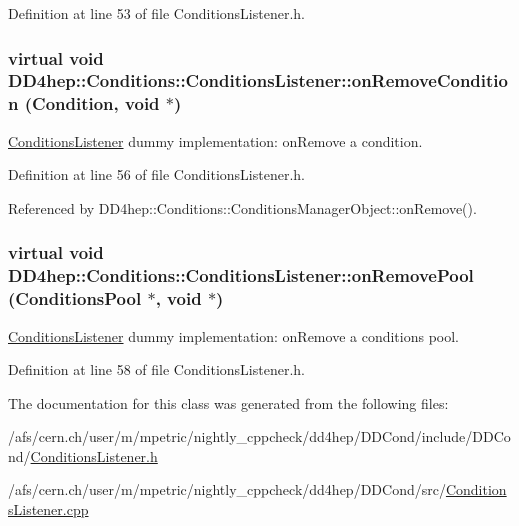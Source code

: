 Definition at line 53 of file ConditionsListener.h.\hypertarget{class_d_d4hep_1_1_conditions_1_1_conditions_listener_ab0c021c6ef8e6c47f28dd077220ee1f3}{
\subsubsection[{onRemoveCondition}]{\setlength{\rightskip}{0pt plus 5cm}virtual void DD4hep::Conditions::ConditionsListener::onRemoveCondition ({\bf Condition}, \/  void $\ast$)}}
\label{class_d_d4hep_1_1_conditions_1_1_conditions_listener_ab0c021c6ef8e6c47f28dd077220ee1f3}


\hyperlink{class_d_d4hep_1_1_conditions_1_1_conditions_listener}{ConditionsListener} dummy implementation: onRemove a condition. 

Definition at line 56 of file ConditionsListener.h.

Referenced by DD4hep::Conditions::ConditionsManagerObject::onRemove().\hypertarget{class_d_d4hep_1_1_conditions_1_1_conditions_listener_aadd6949fa8606ac66cab08494ab79412}{
\subsubsection[{onRemovePool}]{\setlength{\rightskip}{0pt plus 5cm}virtual void DD4hep::Conditions::ConditionsListener::onRemovePool ({\bf ConditionsPool} $\ast$, \/  void $\ast$)}}
\label{class_d_d4hep_1_1_conditions_1_1_conditions_listener_aadd6949fa8606ac66cab08494ab79412}


\hyperlink{class_d_d4hep_1_1_conditions_1_1_conditions_listener}{ConditionsListener} dummy implementation: onRemove a conditions pool. 

Definition at line 58 of file ConditionsListener.h.

The documentation for this class was generated from the following files:\begin{DoxyCompactItemize}
\item 
/afs/cern.ch/user/m/mpetric/nightly\_\-cppcheck/dd4hep/DDCond/include/DDCond/\hyperlink{_conditions_listener_8h}{ConditionsListener.h}\item 
/afs/cern.ch/user/m/mpetric/nightly\_\-cppcheck/dd4hep/DDCond/src/\hyperlink{_conditions_listener_8cpp}{ConditionsListener.cpp}\end{DoxyCompactItemize}
